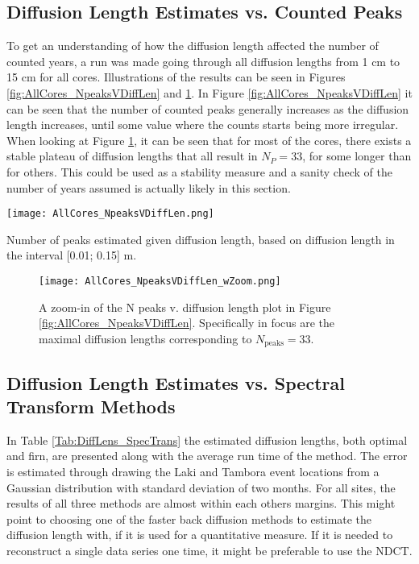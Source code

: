 \documentclass[../../CompleteThesis2/Complete_2ndDraft]{subfiles}
\begin{document}
\subsection[Diffusion Length V N Peaks]{Diffusion Length Estimates vs. Counted Peaks}
\label{Subsec:Results_DiffLenEst_AlphabetCores_DiffLenVPeaks}
To get an understanding of how the diffusion length affected the number of counted years, a run was made going through all diffusion lengths from 1 cm to 15 cm for all cores. Illustrations of the results can be seen in Figures \ref{fig:AllCores_NpeaksVDiffLen} and \ref{fig:AllCores_NpeaksVDiffLenZoom}. In Figure \ref{fig:AllCores_NpeaksVDiffLen} it can be seen that the number of counted peaks generally increases as the diffusion length increases, until some value where the counts starts being more irregular. 
When looking at Figure \ref{fig:AllCores_NpeaksVDiffLenZoom}, it can be seen that for most of the cores, there exists a stable plateau of diffusion lengths that all result in $N_P=33$, for some longer than for others. This could be used as a stability measure and a sanity check of the number of years assumed is actually likely in this section. 

\begin{marginfigure}
	\centering
	\texttt{[image: AllCores\_NpeaksVDiffLen.png]}
	\caption[$\sigma$ vs. N Peaks]{\footnotesize Number of peaks estimated given diffusion length, based on diffusion length in the interval [0.01; 0.15] m.}
	\label{fig:AllCores_NpeaksVDiffLen}
\end{marginfigure}

\begin{figure}[h]
	\centering
	\texttt{[image: AllCores\_NpeaksVDiffLen\_wZoom.png]}
	\caption[$\sigma$ vs. N Peaks]{\small A zoom-in of the N peaks v. diffusion length plot in Figure \ref{fig:AllCores_NpeaksVDiffLen}. Specifically in focus are the maximal diffusion lengths corresponding to $N_{\text{peaks}}=33$.}
	\label{fig:AllCores_NpeaksVDiffLenZoom}
\end{figure}



\subsection[$\sigma$ v. Spectral Transforms]{Diffusion Length Estimates vs. Spectral Transform Methods}
\label{Subsec:Results_DiffLenEst_AlphabetCores_SpectralTransforms}
In Table \ref{Tab:DiffLens_SpecTrans} the estimated diffusion lengths, both optimal and firn, are presented along with the average run time of the method. The error is estimated through drawing the Laki and Tambora event locations from a Gaussian distribution with standard deviation of two months. For all sites, the results of all three methods are almost within each others margins. This might point to choosing one of the faster back diffusion methods to estimate the diffusion length with, if it is used for a quantitative measure. If it is needed to reconstruct a single data series one time, it might be preferable to use the NDCT.
\end{document}
